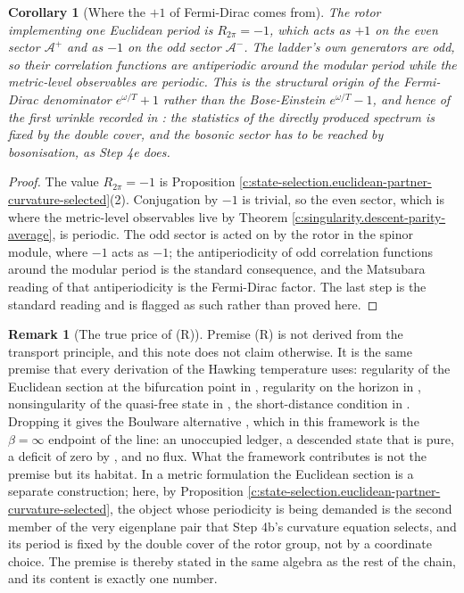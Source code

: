 \documentclass[11pt]{article}
\newtheorem{corollary}[theorem]{Corollary}
\theoremstyle{definition}
\newtheorem{remark}[theorem]{Remark}
\theoremstyle{plain}
\providecommand{\Aev}{}\renewcommand{\Aev}{\mathcal{A}^{+}}
\providecommand{\Aod}{}\renewcommand{\Aod}{\mathcal{A}^{-}}
\begin{document}
\begin{corollary}[Where the $+1$ of Fermi-Dirac comes from]\label{c:state-selection.where-fermi-dirac-comes}
The rotor implementing one Euclidean period is $R_{2\pi} = -1$, which acts as $+1$ on the even sector $\Aev$ and as $-1$ on the odd sector $\Aod$. The ladder's own generators are odd, so their correlation functions are antiperiodic around the modular period while the metric-level observables are periodic. This is the structural origin of the Fermi-Dirac denominator $e^{\omega/T} + 1$ rather than the Bose-Einstein $e^{\omega/T} - 1$, and hence of the first wrinkle recorded in \cite[Rem.~7.5]{ButlerT5}: the statistics of the directly produced spectrum is fixed by the double cover, and the bosonic sector has to be reached by bosonisation, as Step 4e does.
\end{corollary}
\begin{proof}
The value $R_{2\pi} = -1$ is Proposition \ref{c:state-selection.euclidean-partner-curvature-selected}(2). Conjugation by $-1$ is trivial, so the even sector, which is where the metric-level observables live by Theorem \ref{c:singularity.descent-parity-average}, is periodic. The odd sector is acted on by the rotor in the spinor module, where $-1$ acts as $-1$; the antiperiodicity of odd correlation functions around the modular period is the standard consequence, and the Matsubara reading of that antiperiodicity is the Fermi-Dirac factor. The last step is the standard reading and is flagged as such rather than proved here.

\end{proof}

\begin{remark}[The true price of (R)]\label{c:note.state-selection.true-price-r}
Premise (R) is not derived from the transport principle, and this note does not claim otherwise. It is the same premise that every derivation of the Hawking temperature uses: regularity of the Euclidean section at the bifurcation point in \cite{GibbonsHawking1977, HartleHawking1976}, regularity on the horizon in \cite{Unruh1976}, nonsingularity of the quasi-free state in \cite{KayWald1991}, the short-distance condition in \cite{FredenhagenHaag1990}. Dropping it gives the Boulware alternative \cite{Boulware1975}, which in this framework is the $\beta = \infty$ endpoint of the line: an unoccupied ledger, a descended state that is pure, a deficit of zero by \cite[Thm.~9.3]{ButlerT5}, and no flux. What the framework contributes is not the premise but its habitat. In a metric formulation the Euclidean section is a separate construction; here, by Proposition \ref{c:state-selection.euclidean-partner-curvature-selected}, the object whose periodicity is being demanded is the second member of the very eigenplane pair that Step 4b's curvature equation selects, and its period is fixed by the double cover of the rotor group, not by a coordinate choice. The premise is thereby stated in the same algebra as the rest of the chain, and its content is exactly one number.
\end{remark}
\end{document}
